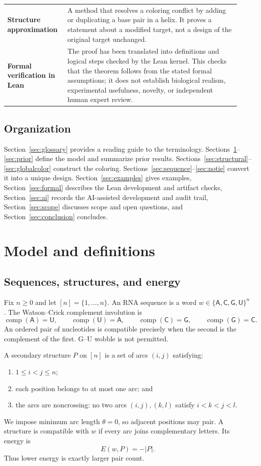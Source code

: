 \documentclass[11pt]{article}
\newcommand{\A}{\textsf{A}}
\newcommand{\C}{\textsf{C}}
\newcommand{\G}{\textsf{G}}
\newcommand{\U}{\textsf{U}}
\newcommand{\comp}{\operatorname{comp}}
\begin{document}
{\begin{longtable}{@{}>{\raggedright\arraybackslash\bfseries}p{0.235\linewidth}>{\raggedright\arraybackslash}p{0.705\linewidth}@{}}
\addlinespace[3pt]
Structure approximation & A method that resolves a coloring conflict by adding or duplicating a base pair in a helix.  It proves a statement about a modified target, not a design of the original target unchanged. \\
\addlinespace[3pt]
Formal verification in Lean & The proof has been translated into definitions and logical steps checked by the Lean kernel.  This checks that the theorem follows from the stated formal assumptions; it does not establish biological realism, experimental usefulness, novelty, or independent human expert review. \\
\end{longtable}
}

\subsection{Organization}

Section~\ref{sec:glossary} provides a reading guide to the terminology.  Sections~\ref{sec:model}--\ref{sec:prior} define the model and summarize prior results.  Sections~\ref{sec:structural}--\ref{sec:globalcolor} construct the coloring.  Sections~\ref{sec:sequence}--\ref{sec:notie} convert it into a unique design.  Section~\ref{sec:examples} gives examples, Section~\ref{sec:formal} describes the Lean development and artifact checks, Section~\ref{sec:ai} records the AI-assisted development and audit trail, Section~\ref{sec:scope} discusses scope and open questions, and Section~\ref{sec:conclusion} concludes.

\section{Model and definitions}
\label{sec:model}

\subsection{Sequences, structures, and energy}

Fix $n\ge 0$ and let $[n]=\{1,\dots,n\}$.  An RNA sequence is a word $w\in\{\A,\C,\G,\U\}^n$.  The Watson--Crick complement involution is
\[
\comp(\A)=\U,
\qquad \comp(\U)=\A,
\qquad \comp(\C)=\G,
\qquad \comp(\G)=\C.
\]
An ordered pair of nucleotides is compatible precisely when the second is the complement of the first.  G--U wobble is not permitted.

A secondary structure $P$ on $[n]$ is a set of arcs $(i,j)$ satisfying:
\begin{enumerate}
\item $1\le i<j\le n$;
\item each position belongs to at most one arc; and
\item the arcs are noncrossing: no two arcs $(i,j),(k,l)$ satisfy $i<k<j<l$.
\end{enumerate}
We impose minimum arc length $\theta=0$, so adjacent positions may pair.  A structure is compatible with $w$ if every arc joins complementary letters.  Its energy is
\[
E(w,P)=-|P|.
\]
Thus lower energy is exactly larger pair count.
\end{document}
